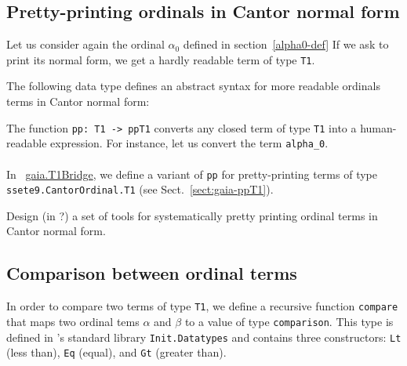 \subsection{Pretty-printing ordinals in Cantor normal form}
\label{sect:ppT1}

Let us consider again the ordinal $\alpha_0$ defined in section~\vref{alpha0-def}
If we ask \coq{} to print its  normal form, we get a hardly readable term of type \texttt{T1}.



The following data type defines an abstract syntax for more readable ordinals terms in Cantor normal form:

\label{types:ppT1}




The function \texttt{pp: T1 -> ppT1} converts any closed term of type \texttt{T1} into a human-readable expression. For instance, let us convert the term \texttt{alpha\_0}.



\paragraph*{\gaiasign}
In ~\href{../theories/html/gaia.T1Bridge.html}{gaia.T1Bridge},
we define a variant of \texttt{pp} for pretty-printing terms of type \texttt{ssete9.CantorOrdinal.T1} (see Sect.~\vref{sect:gaia-ppT1}).

\begin{project}
Design  (in \ocaml?) a set of tools for systematically pretty printing ordinal terms in Cantor normal form.
\end{project}


\subsection{Comparison between ordinal terms}
\label{sec:orgheadline73}



In order to compare two terms of type \texttt{T1}, we define a recursive function \texttt{compare} that maps two ordinal tems $\alpha$ and $\beta$ to a value of type \texttt{comparison}. This type is defined in \coq's standard library 
\texttt{Init.Datatypes} and
contains three constructors:  \texttt{Lt} (less than), \texttt{Eq} (equal), and
\texttt{Gt} (greater than).


